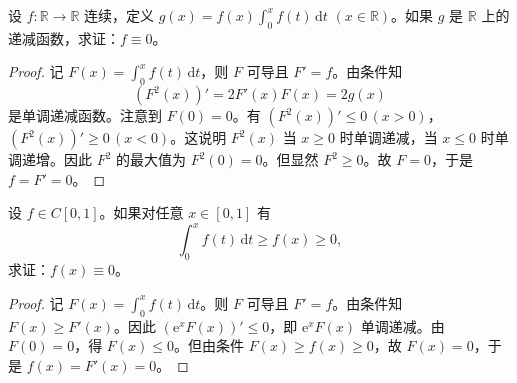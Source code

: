 \documentclass[../../main.tex]{subfiles}
\begin{document}
\begin{example}
设 \( f : \mathbb{R} \to \mathbb{R} \) 连续，定义 \( g(x) = f(x)\int_{0}^{x} f(t) \, \mathrm{d}t \) \((x \in \mathbb{R})\)。如果 \( g \) 是 \( \mathbb{R} \) 上的递减函数，求证：\( f \equiv 0 \)。
\end{example}
\begin{proof}
记 \( F(x) = \int_{0}^{x} f(t) \, \mathrm{d}t \)，则 \( F \) 可导且 \( F' = f \)。由条件知
\[
(F^2(x))' = 2F'(x)F(x) = 2g(x)
\]
是单调递减函数。注意到 \( F(0) = 0 \)。有 \( (F^2(x))' \leqslant 0 \, (x > 0) \)，\( (F^2(x))' \geqslant 0 \, (x < 0) \)。这说明 \( F^2(x) \) 当 \( x \geqslant 0 \) 时单调递减，当 \( x \leqslant 0 \) 时单调递增。因此 \( F^2 \) 的最大值为 \( F^2(0) = 0 \)。但显然 \( F^2 \geqslant 0 \)。故 \( F = 0 \)，于是 \( f =F'= 0 \)。
\end{proof}

\begin{example}
设 \( f \in C[0,1] \)。如果对任意 \( x \in [0,1] \) 有
\[
\int_{0}^{x} f(t) \, \mathrm{d}t \geqslant f(x) \geqslant 0,
\]
求证：\( f(x) \equiv 0 \)。
\end{example}
\begin{proof}
记 \( F(x) = \int_{0}^{x} f(t) \, \mathrm{d}t \)。则 \( F \) 可导且 \( F' = f \)。由条件知 \( F(x) \geqslant F'(x) \)。因此 \( (\mathrm{e}^x F(x))' \leqslant 0 \)，即 \( \mathrm{e}^x F(x) \) 单调递减。由 \( F(0) = 0 \)，得 \( F(x) \leqslant 0 \)。但由条件 \( F(x) \geqslant f(x) \geqslant 0 \)，故 \( F(x) = 0 \)，于是 \( f(x) =F'(x)= 0 \)。
\end{proof}
\end{document}
